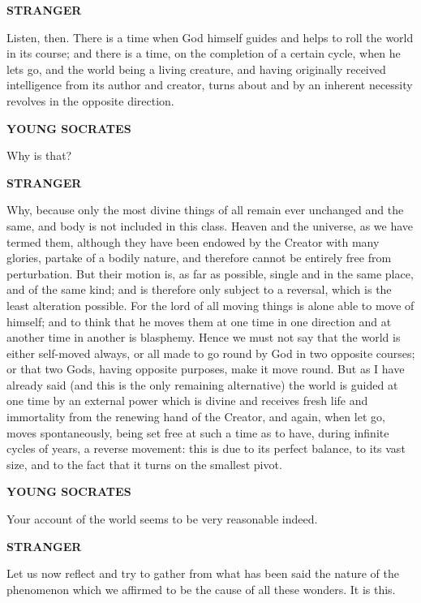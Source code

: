 \documentclass[11pt,letter]{article}
\begin{document}
\par \textbf{STRANGER}
\par   Listen, then. There is a time when God himself guides and helps to roll the world in its course; and there is a time, on the completion of a certain cycle, when he lets go, and the world being a living creature, and having originally received intelligence from its author and creator, turns about and by an inherent necessity revolves in the opposite direction.

\par \textbf{YOUNG SOCRATES}
\par   Why is that?

\par \textbf{STRANGER}
\par   Why, because only the most divine things of all remain ever unchanged and the same, and body is not included in this class. Heaven and the universe, as we have termed them, although they have been endowed by the Creator with many glories, partake of a bodily nature, and therefore cannot be entirely free from perturbation. But their motion is, as far as possible, single and in the same place, and of the same kind; and is therefore only subject to a reversal, which is the least alteration possible. For the lord of all moving things is alone able to move of himself; and to think that he moves them at one time in one direction and at another time in another is blasphemy. Hence we must not say that the world is either self-moved always, or all made to go round by God in two opposite courses; or that two Gods, having opposite purposes, make it move round. But as I have already said (and this is the only remaining alternative) the world is guided at one time by an external power which is divine and receives fresh life and immortality from the renewing hand of the Creator, and again, when let go, moves spontaneously, being set free at such a time as to have, during infinite cycles of years, a reverse movement:  this is due to its perfect balance, to its vast size, and to the fact that it turns on the smallest pivot.

\par \textbf{YOUNG SOCRATES}
\par   Your account of the world seems to be very reasonable indeed.

\par \textbf{STRANGER}
\par   Let us now reflect and try to gather from what has been said the nature of the phenomenon which we affirmed to be the cause of all these wonders. It is this.
\end{document}
